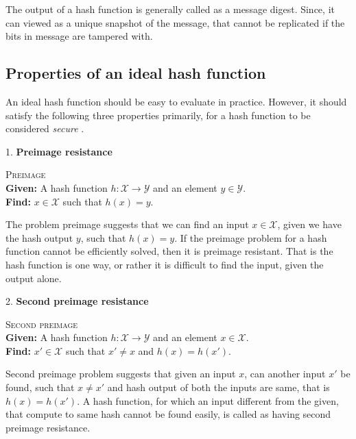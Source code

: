 The output of a hash function is generally called as a message digest. Since, it can viewed as a unique
snapshot of the message, that cannot be replicated if the bits in message are tampered with.
  
\subsection{Properties of an ideal hash function}
An ideal hash function should be easy to evaluate in practice. However, it should satisfy the following
three properties primarily, for a hash function to be considered \emph{secure} \cite{00005}.

1. {\bf Preimage resistance}
\begin{center}
  \framebox
  {
    \parbox{300pt}
    {
      \centering \textsc{Preimage} \\
      {\bf Given:} A hash function $h : \mathcal{X} \to \mathcal{Y}$ and an element $y \in \mathcal{Y}$. \\
      {\bf Find:} $x \in \mathcal{X}$ such that $h(x) = y$. 
    }
  }
\end{center}
\vspace{4mm}

The problem preimage suggests that we can find an input $x \in \mathcal{X}$, given we have the hash 
output $y$, such that $h(x) = y$. If the preimage problem for a hash function cannot be efficiently
solved, then it is preimage resistant. That is the hash function is one way, or rather it is difficult
to find the input, given the output alone.

2. {\bf Second preimage resistance}
\begin{center}
  \framebox
  {
    \parbox{300pt}
    {
      \centering \textsc{Second preimage} \\
      {\bf Given:} A hash function $h : \mathcal{X} \to \mathcal{Y}$ and an element $x \in \mathcal{X}$. \\
      {\bf Find:} $x' \in \mathcal{X}$ such that $x' \neq x$ and $h(x) = h(x')$. 
    }
  }
\end{center}
\vspace{4mm}

Second preimage problem suggests that given an input $x$, can another input $x'$ be found, such that
$ x \neq x'$ and hash output of both the inputs are same, that is $h(x) = h(x')$. A hash function, for
which an input different from the given, that compute to same hash cannot be found easily, is 
called as having second preimage resistance.

